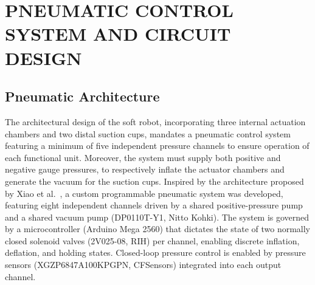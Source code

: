 
%
%

\section{PNEUMATIC CONTROL SYSTEM AND CIRCUIT DESIGN}
\label{sec:inchworm-pneumatics}

\subsection{Pneumatic Architecture}

The architectural design of the soft robot, incorporating three internal
actuation chambers and two distal suction cups, mandates a pneumatic control
system featuring a minimum of five independent pressure channels to ensure
operation of each functional unit. Moreover, the system must supply both
positive and negative gauge pressures, to respectively inflate the actuator
chambers and generate the vacuum for the suction cups. Inspired by the
architecture proposed by Xiao et al.~\cite{Xiao2023Programmable}, a custom
programmable pneumatic system was developed, featuring eight independent
channels driven by a shared positive-pressure pump and a shared vacuum pump
(DP0110T-Y1, Nitto Kohki). The system is governed by a microcontroller
(Arduino Mega 2560) that dictates the state of two normally closed solenoid
valves (2V025-08, RIH) per channel, enabling discrete inflation, deflation,
and holding states. Closed-loop pressure control is enabled by pressure
sensors (XGZP6847A100KPGPN, CFSensors) integrated into each output channel.

